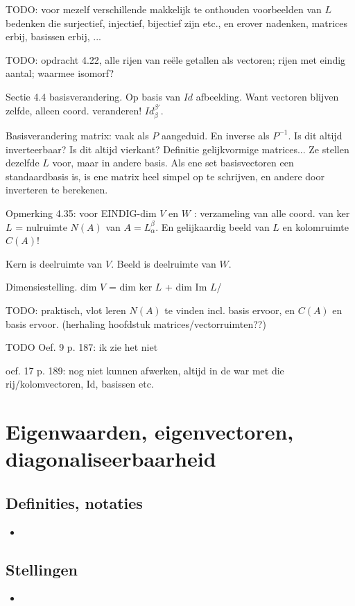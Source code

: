 \documentclass{article}
\begin{document}
TODO: voor mezelf verschillende makkelijk te onthouden voorbeelden van $L$ bedenken die surjectief, injectief, bijectief zijn etc., en erover nadenken, matrices erbij, basissen erbij, ... 

TODO: opdracht 4.22, alle rijen van re\"ele getallen als vectoren; rijen met eindig aantal; waarmee isomorf? 

Sectie 4.4 basisverandering. Op basis van $Id$ afbeelding. Want vectoren blijven zelfde, alleen coord. veranderen! $Id_{\beta}^{\beta'}$. 

Basisverandering matrix: vaak als $P$ aangeduid. En inverse als $P^{-1}$. Is dit altijd inverteerbaar? Is dit altijd vierkant? Definitie gelijkvormige matrices... Ze stellen dezelfde $L$ voor, maar in andere basis. 
Als ene set basisvectoren een standaardbasis is, is ene matrix heel simpel op te schrijven, en andere door inverteren te berekenen. 

Opmerking 4.35: voor EINDIG-dim $V$ en $W$ : verzameling van alle coord. van ker $L$ = nulruimte $N(A)$ van $A = L_{\alpha}^{\beta}$. En gelijkaardig beeld van $L$ en kolomruimte $C(A)$! 

Kern is deelruimte van $V$. Beeld is deelruimte van $W$. 

Dimensiestelling. dim $V$ = dim ker $L$ + dim Im $L$/ 

TODO: praktisch, vlot leren $N(A)$ te vinden incl. basis ervoor, en $C(A)$ en basis ervoor. (herhaling hoofdstuk matrices/vectorruimten??) 

TODO Oef. 9 p. 187: ik zie het niet

oef. 17 p. 189: nog niet kunnen afwerken, altijd in de war met die rij/kolomvectoren, Id, basissen etc. 




\section{Eigenwaarden, eigenvectoren, diagonaliseerbaarheid}

\subsection{Definities, notaties}
\begin{itemize}
    \item 
\end{itemize}

\subsection{Stellingen}
\begin{itemize}
    \item 
\end{itemize}
\end{document}
